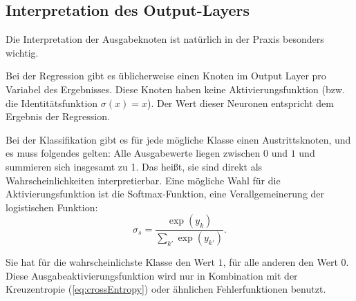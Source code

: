\subsection{Interpretation des Output-Layers}
Die Interpretation der Ausgabeknoten ist natürlich in der Praxis besonders wichtig.

Bei der Regression gibt es üblicherweise einen Knoten im Output Layer pro Variabel des Ergebnisses. Diese Knoten haben keine Aktivierungsfunktion (bzw. die Identitätsfunktion $\sigma(x) = x$). Der Wert dieser Neuronen entspricht dem Ergebnis der Regression. 

Bei der Klassifikation gibt es für jede mögliche Klasse einen Austrittsknoten, und es muss folgendes gelten:
Alle Ausgabewerte liegen zwischen $0$ und $1$ und summieren sich insgesamt zu 1.
Das heißt, sie sind direkt als Wahrscheinlichkeiten interpretierbar. Eine mögliche Wahl für die Aktivierungsfunktion ist die Softmax-Funktion, eine Verallgemeinerung der logistischen Funktion:
\begin{equation}
\label{eq:softmax}
	\sigma_s = \frac{\exp (y_k)}{\sum_{k'} \exp (y_{k'})}.
\end{equation}

Sie hat für die wahrscheinlichste Klasse den Wert $1$, für alle anderen den Wert $0$. Diese Ausgabeaktivierungsfunktion wird nur in Kombination mit der Kreuzentropie (\ref{eq:crossEntropy}) oder ähnlichen Fehlerfunktionen benutzt\cite{bishop1995neural}. 
